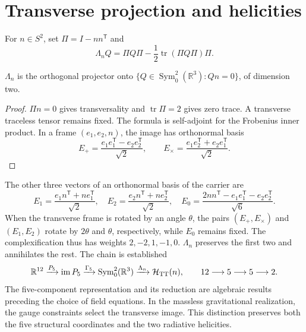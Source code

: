 \section{Transverse projection and helicities}
For \(n\in S^2\), set \(\Pi=I-nn^{\mathsf T}\) and
\[
 \Lambda_nQ=\Pi Q\Pi-\frac12\operatorname{tr}(\Pi Q\Pi)\Pi.
\]
\begin{proposition}
\(\Lambda_n\) is the orthogonal projector onto
\(\{Q\in\operatorname{Sym}^2_0(\mathbb R^3):Qn=0\}\), of dimension two.
\end{proposition}
\begin{proof}
\(\Pi n=0\) gives transversality and \(\operatorname{tr}\Pi=2\) gives
zero trace. A transverse traceless tensor remains fixed.
The formula is self-adjoint for the Frobenius inner product.
In a frame \((e_1,e_2,n)\), the image has orthonormal basis
\[
 E_+=\frac{e_1e_1^{\mathsf T}-e_2e_2^{\mathsf T}}{\sqrt2},\qquad
 E_\times=\frac{e_1e_2^{\mathsf T}+e_2e_1^{\mathsf T}}{\sqrt2}.
\]
\end{proof}
The other three vectors of an orthonormal basis of the carrier are
\[
 E_1=\frac{e_1n^{\mathsf T}+ne_1^{\mathsf T}}{\sqrt2},\quad
 E_2=\frac{e_2n^{\mathsf T}+ne_2^{\mathsf T}}{\sqrt2},\quad
 E_0=\frac{2nn^{\mathsf T}-e_1e_1^{\mathsf T}-e_2e_2^{\mathsf T}}{\sqrt6}.
\]
When the transverse frame is rotated by an angle \(\theta\), the pairs
\((E_+,E_\times)\) and \((E_1,E_2)\) rotate by \(2\theta\) and
\(\theta\), respectively, while \(E_0\) remains fixed. The
complexification thus has weights \(2,-2,1,-1,0\).
\(\Lambda_n\) preserves the first two and annihilates the rest.
The chain is established
\[
 \mathbb R^{12}\xrightarrow{P_5}\operatorname{im}P_5
 \xrightarrow{\Gamma_5}\operatorname{Sym}^2_0(\mathbb R^3)
 \xrightarrow{\Lambda_n}\mathcal H_{\rm TT}(n),
 \qquad 12\longrightarrow5\longrightarrow5\longrightarrow2.
\]
The five-component representation and its reduction are algebraic
results preceding the choice of field equations.
In the massless gravitational realization, the gauge constraints
select the transverse image. This distinction preserves both the
five structural coordinates and the two radiative helicities.






